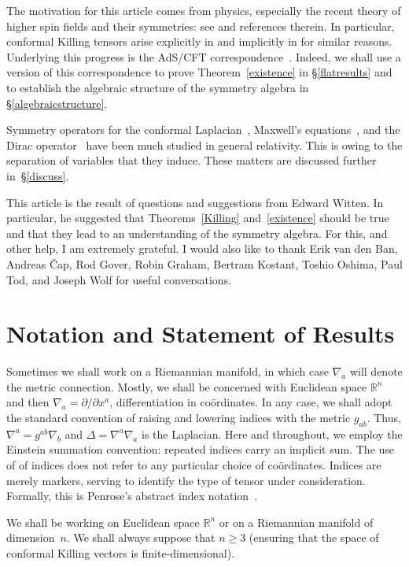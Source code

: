 \documentclass[a4paper,12pt]{amsart}
\begin{document}
The motivation for this article comes from physics, especially the recent
theory of higher spin fields and their symmetries: see \cite{mik,ss,v} and
references therein. In particular, conformal Killing tensors arise explicitly
in \cite{mik} and implicitly in \cite{v} for similar reasons. Underlying this
progress is the AdS/CFT correspondence~\cite{gr,ma,wi}. Indeed, we shall use a
version of this correspondence to prove Theorem~\ref{existence} in
\S\ref{flatresults} and to establish the algebraic structure of the symmetry
algebra in \S\ref{algebraicstructure}.

Symmetry operators for the conformal Laplacian~\cite{km}, Maxwell's
equations~\cite{kmw}, and the Dirac operator~\cite{msw} have been much studied
in general relativity. This is owing to the separation of variables that they
induce. These matters are
discussed further in~\S\ref{discuss}.

This article is the result of questions and suggestions from Edward Witten. In
particular, he suggested that Theorems~\ref{Killing} and~\ref{existence} should
be true and that they lead to an understanding of the symmetry algebra. For
this, and other help, I am extremely grateful. I would also like to thank Erik
van den Ban, Andreas \v{C}ap, Rod Gover, Robin Graham, Bertram Kostant, Toshio
Oshima, Paul Tod, and Joseph Wolf for useful conversations.

\section{Notation and Statement of Results}\label{statement}
Sometimes we shall work on a Riemannian manifold, in which case $\nabla_a$ will
denote the metric connection. Mostly, we shall be concerned with Euclidean
space ${\mathbb R}^n$ and then $\nabla_a=\partial/\partial x^a$,
differentiation in co\"ordinates. In any case, we shall adopt the standard
convention of raising and lowering indices with the metric $g_{ab}$. Thus,
$\nabla^a=g^{ab}\nabla_b$ and $\Delta=\nabla^a\nabla_a$ is the Laplacian. Here
and throughout, we employ the Einstein summation convention: repeated indices
carry an implicit sum. The use of of indices does not refer to any particular
choice of co\"ordinates. Indices are merely markers, serving to identify the
type of tensor under consideration. Formally, this is Penrose's abstract index
notation~\cite{OT}.

We shall be working on Euclidean space ${\mathbb R}^n$
or on a Riemannian manifold of dimension~$n$. We shall always suppose that
$n\geq 3$ (ensuring that the space of conformal Killing vectors is
finite-dimensional).
\end{document}
